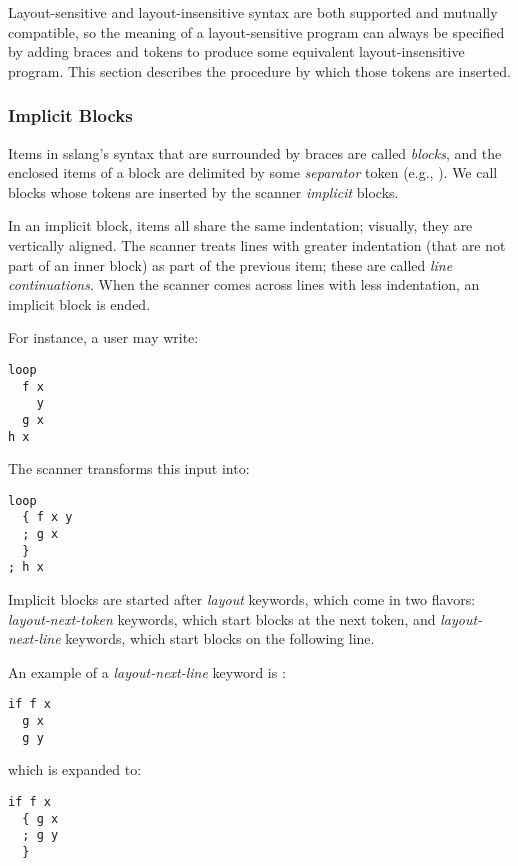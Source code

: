 \documentclass{article}
\begin{document}
Layout-sensitive and layout-insensitive syntax are both supported and
mutually compatible, so the meaning of a layout-sensitive program can always
be specified by adding braces and tokens to produce some equivalent
layout-insensitive program.
This section describes the procedure by which those tokens are inserted.

\subsubsection{Implicit Blocks}

Items in sslang's syntax that are surrounded by braces are called \emph{blocks},
and the enclosed items of a block are delimited by some \emph{separator} token (e.g., \lit*{;}).
We call blocks whose tokens are inserted by the scanner \emph{implicit} blocks.

In an implicit block, items all share the same indentation; visually, they are
vertically aligned.
The scanner treats lines with greater indentation
(that are not part of an inner block) as part of the previous item;
these are called \emph{line continuations}.
When the scanner comes across lines with less indentation,
an implicit block is ended.

For instance, a user may write:

\begin{lstlisting}
loop
  f x
    y
  g x
h x
\end{lstlisting}

The scanner transforms this input into:

\begin{lstlisting}
loop
  { f x y
  ; g x
  }
; h x
\end{lstlisting}

Implicit blocks are started after \emph{layout} keywords, which come in two flavors:
\emph{layout-next-token} keywords, which start blocks at the next token, and
\emph{layout-next-line} keywords, which start blocks on the following line.

An example of a \emph{layout-next-line} keyword is :

\begin{lstlisting}
if f x
  g x
  g y
\end{lstlisting}

which is expanded to:

\begin{lstlisting}
if f x
  { g x
  ; g y
  }
\end{lstlisting}
\end{document}
